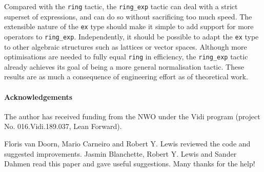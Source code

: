 \documentclass{llncs}
\newcommand{\lean}[1]{\texttt{#1}\xspace} %
\newcommand{\ex}{\lean{ex}}
\newcommand{\ring}{\lean{ring}}
\newcommand{\ringexp}{\lean{ring\_exp}}
\begin{document}
Compared with the \ring tactic, the \ringexp tactic can deal with a strict superset of expressions,
and can do so without sacrificing too much speed.
The extensible nature of the \ex type should make it simple to add support for more operators to \ringexp.
Independently, it should be possible to adapt the \ex type to other algebraic structures
such as lattices or vector spaces.
Although more optimisations are needed to fully equal \ring in efficiency,
the \ringexp tactic already achieves its goal of being a more general normalisation tactic.
These results are as much a consequence of engineering effort as of theoretical work.


\paragraph{Acknowledgements}
The author has received funding from the NWO under the Vidi program (project
No. 016.Vidi.189.037, Lean Forward).

Floris van Doorn, Mario Carneiro and Robert Y. Lewis reviewed the code and
suggested improvements.
Jasmin Blanchette, Robert Y. Lewis and Sander Dahmen read this paper and gave useful suggestions.
Many thanks for the help!

\printbibliography
\end{document}
